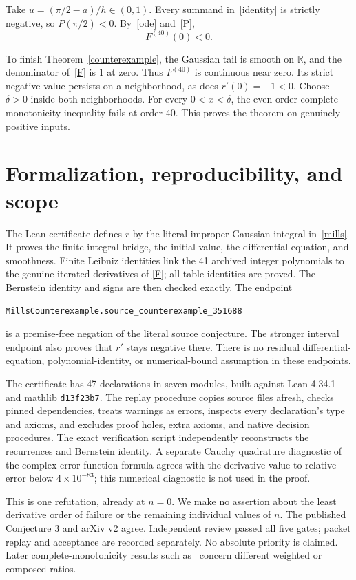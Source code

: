 \documentclass[11pt]{article}
\newcommand{\R}{\mathbb R}
\begin{document}
Take $u=(\pi/2-a)/h\in(0,1)$. Every summand in~\eqref{identity} is
strictly negative, so $P(\pi/2)<0$. By~\eqref{ode} and~\eqref{P},
\[
 F^{(40)}(0)<0.
\]

To finish Theorem~\ref{counterexample}, the Gaussian tail is smooth on
$\R$, and the denominator of~\eqref{F} is 1 at zero. Thus $F^{(40)}$ is
continuous near zero. Its strict negative value persists on a
neighborhood, as does $r'(0)=-1<0$. Choose $\delta>0$ inside both
neighborhoods. For every $0<x<\delta$, the even-order complete-monotonicity
inequality fails at order 40. This proves the theorem on genuinely positive
inputs.

\section{Formalization, reproducibility, and scope}
The Lean certificate defines $r$ by the literal improper Gaussian integral
in~\eqref{mills}. It proves the finite-integral bridge, the initial value,
the differential equation, and smoothness. Finite Leibniz identities link
the 41 archived integer polynomials to the genuine iterated derivatives of
\eqref{F}; all table identities are proved. The Bernstein identity and
signs are then checked exactly. The endpoint
\begin{center}
\texttt{MillsCounterexample.source\_counterexample\_351688}
\end{center}
is a premise-free negation of the literal source conjecture. The stronger
interval endpoint also proves that $r'$ stays negative there. There is no
residual differential-equation, polynomial-identity, or numerical-bound
assumption in these endpoints.

The certificate has 47 declarations in seven modules, built against Lean
4.34.1 and mathlib \texttt{d13f23b7}. The replay procedure copies source
files afresh, checks pinned dependencies, treats warnings as errors,
inspects every declaration's type and axioms, and excludes proof holes,
extra axioms, and native decision procedures. The exact verification script
independently reconstructs the recurrences and Bernstein identity. A
separate Cauchy quadrature diagnostic of the complex error-function formula
agrees with the derivative value to relative error below $4\times10^{-83}$;
this numerical diagnostic is not used in the proof.

This is one refutation, already at $n=0$. We make no assertion about the
least derivative order of failure or the remaining individual values of
$n$. The published Conjecture 3 and arXiv v2 agree. Independent review passed
all five gates; packet replay and acceptance are recorded separately.
No absolute priority is claimed. Later complete-monotonicity results such as~\cite{Yang}
concern different weighted or composed ratios.
\end{document}
